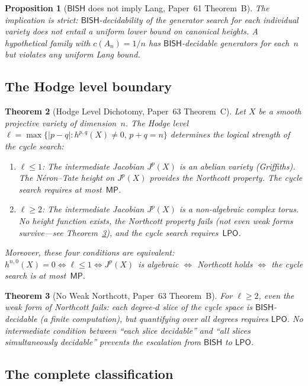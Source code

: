 \documentclass[11pt]{article}
\theoremstyle{plain}
\newtheorem{theorem}{Theorem}[section]
\newtheorem{proposition}[theorem]{Proposition}
\theoremstyle{definition}
\theoremstyle{remark}
\newcommand{\BISH}{\mathsf{BISH}}
\newcommand{\LPO}{\mathsf{LPO}}
\newcommand{\MP}{\mathsf{MP}}
\begin{document}
\begin{proposition}[$\BISH$ does not imply Lang,
  Paper~61 Theorem~B]\label{prop:nolang}
The implication is strict: $\BISH$-decidability of the generator
search for each individual variety does not entail a uniform
lower bound on canonical heights.  A hypothetical family with
$c(A_n) = 1/n$ has $\BISH$-decidable generators for each~$n$
but violates any uniform Lang bound.
\end{proposition}

\subsection{The Hodge level boundary}

\begin{theorem}[Hodge Level Dichotomy,
  Paper~63 Theorem~C]\label{thm:hodge}
Let $X$ be a smooth projective variety of dimension~$n$.  The
Hodge level $\ell = \max\{|p - q| : h^{p,q}(X) \ne 0,\,
p + q = n\}$ determines the logical strength of the cycle search:
\begin{enumerate}[label=(\roman*)]
\item $\ell \le 1$: The intermediate Jacobian $J^p(X)$ is an
  abelian variety (Griffiths).  The N\'eron--Tate height on
  $J^p(X)$ provides the Northcott property.  The cycle search
  requires at most~$\MP$.
\item $\ell \ge 2$: The intermediate Jacobian $J^p(X)$ is a
  non-algebraic complex torus.  No height function exists, the
  Northcott property fails (not even weak forms survive---see
  Theorem~\ref{thm:noweak}), and the cycle search
  requires~$\LPO$.
\end{enumerate}
Moreover, these four conditions are equivalent:
$h^{n,0}(X) = 0 \iff \ell \le 1 \iff J^p(X)$~is algebraic
$\iff$ Northcott holds $\iff$ the cycle search is at
most~$\MP$.
\end{theorem}

\begin{theorem}[No Weak Northcott,
  Paper~63 Theorem~B]\label{thm:noweak}
For $\ell \ge 2$, even the weak form of Northcott fails: each
degree-$d$ slice of the cycle space is $\BISH$-decidable (a
finite computation), but quantifying over all degrees requires
$\LPO$.  No intermediate condition between ``each slice
decidable'' and ``all slices simultaneously decidable''
prevents the escalation from $\BISH$ to $\LPO$.
\end{theorem}


\subsection{The complete classification}
\end{document}
